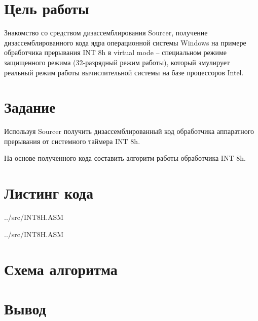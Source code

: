 \section*{Цель работы}

Знакомство со средством дизассемблирования Sourcer, получение дизассемблированного кода ядра операционной системы Windows на примере обработчика прерывания INT 8h в virtual mode – специальном режиме защищенного режима (32-разрядный режим работы), который эмулирует реальный режим работы  вычислительной системы на базе процессоров Intel.

\section*{Задание}

Используя Sourcer получить дизассемблированный код обработчика аппаратного прерывания от системного таймера INT 8h.

На основе полученного кода составить алгоритм работы обработчика INT 8h.

\section*{Листинг кода}

\begin{lstinputlisting}[
	caption={Обработчик INT 8h},
	label={lst:int8h},
	style={asm},
	linerange={1-76}
]{../src/INT8H.ASM}
\end{lstinputlisting}

\begin{lstinputlisting}[
	caption={Процедура sub\_1},
	label={lst:sub_1},
	style={asm},
	linerange={77-102}
]{../src/INT8H.ASM}
\end{lstinputlisting}

\clearpage

\section*{Схема алгоритма}




\clearpage

\section*{Вывод}

